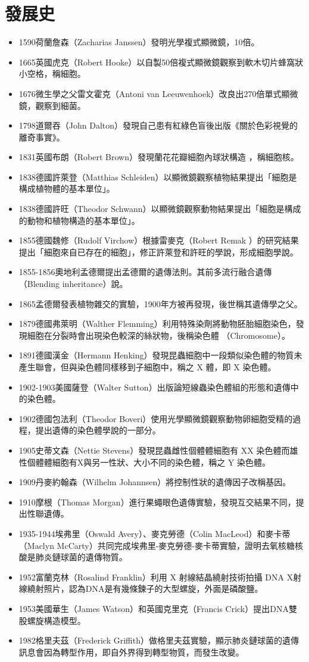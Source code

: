 \documentclass[a4paper,12pt]{report}
\begin{document}
\section{發展史}
\begin{itemize}
  \item 1590荷蘭詹森（Zacharias Janssen）發明光學複式顯微鏡，10倍。
  \item 1665英國虎克（Robert Hooke）以自製50倍複式顯微鏡觀察到軟木切片蜂窩狀小空格，稱細胞。
  \item 1676微生學之父雷文霍克（Antoni van Leeuwenhoek）改良出270倍單式顯微鏡，觀察到細菌。
  \item 1798道爾吞（John Dalton）發現自己患有紅綠色盲後出版《關於色彩視覺的離奇事實》。
  \item 1831英國布朗（Robert Brown）發現蘭花花瓣細胞內球狀構造 ，稱細胞核。
  \item 1838德國許萊登（Matthias Schleiden）以顯微鏡觀察植物結果提出「細胞是構成植物體的基本單位」。
  \item 1838德國許旺（Theodor Schwann）以顯微鏡觀察動物結果提出「細胞是構成的動物和植物構造的基本單位」。
  \item 1855德國魏修（Rudolf Virchow）根據雷麥克（Robert Remak ）的研究結果提出「細胞來自已存在的細胞」，修正許萊登和許旺的學說，形成細胞學說。
  \item 1855-1856奧地利孟德爾提出孟德爾的遺傳法則。其前多流行融合遺傳（Blending inheritance）說。
  \item 1865孟德爾發表植物雜交的實驗，1900年方被再發現，後世稱其遺傳學之父。
  \item 1879德國弗萊明（Walther Flemming）利用特殊染劑將動物胚胎細胞染色，發現細胞在分裂時會出現染色較深的絲狀物，後稱染色體 （Chromosome）。
  \item 1891德國漢金（Hermann Henking）發現昆蟲細胞中一段類似染色體的物質未產生聯會，但與染色體同樣移到子細胞中，稱之 X 體，即 X 染色體。
  \item 1902-1903美國薩登（Walter Sutton）出版論短線蟲染色體組的形態和遺傳中的染色體。
  \item 1902德國包法利（Theodor Boveri）使用光學顯微鏡觀察動物卵細胞受精的過程，提出遺傳的染色體學說的一部分。
  \item 1905史蒂文森（Nettie Stevens）發現昆蟲雌性個體體細胞有 XX 染色體而雄性個體體細胞有X與另一性狀、大小不同的染色體，稱之 Y 染色體。
  \item 1909丹麥約翰森（Wilhelm Johannsen）將控制性狀的遺傳因子改稱基因。
  \item 1910摩根（Thomas Morgan）進行果蠅眼色遺傳實驗，發現互交結果不同，提出性聯遺傳。
  \item 1935-1944埃弗里（Oswald Avery）、麥克勞德（Colin MacLeod）和麥卡蒂（Maclyn McCarty）共同完成埃弗里-麥克勞德-麥卡蒂實驗，證明去氧核糖核酸是肺炎鏈球菌的遺傳物質。
  \item 1952富蘭克林（Rosalind Franklin）利用 X 射線結晶繞射技術拍攝 DNA X射線繞射照片，認為DNA是有幾條鍊子的大型螺旋，外面是磷酸鹽。
  \item 1953美國華生（James Watson）和英國克里克（Francis Crick）提出DNA雙股螺旋構造模型。
  \item 1982格里夫茲（Frederick Griffith）做格里夫茲實驗，顯示肺炎鏈球菌的遺傳訊息會因為轉型作用，即自外界得到轉型物質，而發生改變。
\end{itemize}
\end{document}
